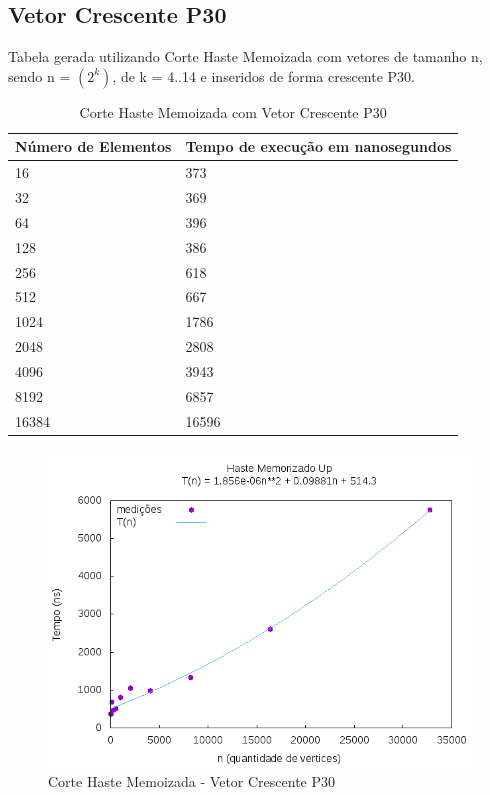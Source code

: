 \documentclass[12pt,a4paper,twoside]{report}
\begin{document}
\subsection{Vetor Crescente P30}
Tabela gerada utilizando Corte Haste Memoizada com vetores de tamanho n, sendo n = $(2^k)$, de k = 4..14 e inseridos de forma crescente P30.
\begin{table}[H]
\centering
\caption{Corte Haste Memoizada com Vetor Crescente P30}
\label{my-label}
\begin{tabular}{|l|l|}
\hline
\multicolumn{1}{|c|}{\textbf{Número de Elementos}} & \multicolumn{1}{c|}{\textbf{Tempo de execução em nanosegundos}} \\ \hline
16 & 373 \\ \hline
32 & 369 \\ \hline
64 & 396 \\ \hline
128 & 386 \\ \hline
256 & 618 \\ \hline
512 & 667 \\ \hline
1024 & 1786 \\ \hline
2048 & 2808 \\ \hline
4096 & 3943 \\ \hline
8192 & 6857 \\ \hline
16384 & 16596 \\ \hline
\end{tabular}
\end{table}

\begin{figure}[H]
    \centering
    \includegraphics[width=0.7\linewidth]{graficos/CorteHasteMemorizado/Crescente P30/HasteMemo.png}
  \caption{Corte Haste Memoizada - Vetor Crescente P30}
\end{figure}
\end{document}
